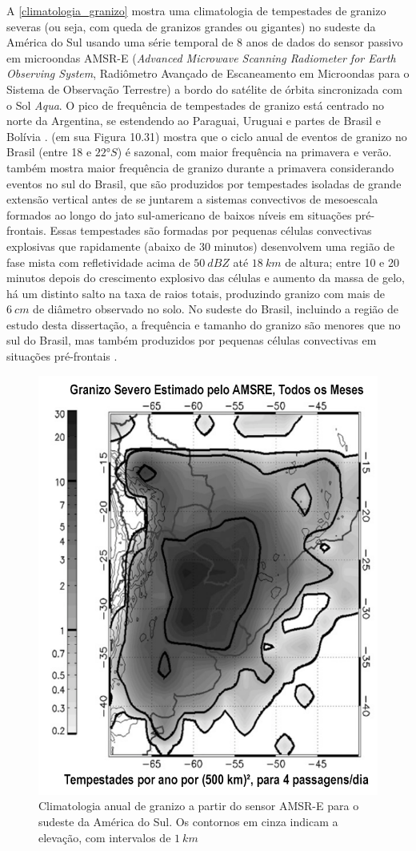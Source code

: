 A \autoref{climatologia_granizo} mostra uma climatologia de tempestades de granizo severas (ou seja, com queda de granizos grandes ou gigantes) no sudeste da América do Sul usando uma série temporal de 8 anos de dados do sensor passivo em microondas AMSR-E (\textit{Advanced Microwave Scanning Radiometer for Earth Observing System}, Radiômetro Avançado de Escaneamento em Microondas para o Sistema de Observação Terrestre) a bordo do satélite de órbita sincronizada com o Sol \textit{Aqua}. O pico de frequência de tempestades de granizo está centrado no norte da Argentina, se estendendo ao Paraguai, Uruguai e partes de Brasil e Bolívia \cite{Cecil2012a}.  (em sua Figura 10.31) mostra que o ciclo anual de eventos de granizo no Brasil (entre 18 e $\ang{22}S$) é sazonal, com maior frequência na primavera e verão.  também mostra maior frequência de granizo durante a primavera considerando eventos no sul do Brasil, que são produzidos por tempestades isoladas de grande extensão vertical antes de se juntarem a sistemas convectivos de mesoescala formados ao longo do jato sul-americano de baixos níveis em situações pré-frontais. Essas tempestades são formadas por pequenas células convectivas explosivas que rapidamente (abaixo de 30 minutos) desenvolvem uma região de fase mista com refletividade acima de $50\:dBZ$ até $18\:km$ de altura; entre 10 e 20 minutos depois do crescimento explosivo das células e aumento da massa de gelo, há um distinto salto na taxa de raios totais, produzindo granizo com mais de $6\:cm$ de diâmetro observado no solo. No sudeste do Brasil, incluindo a região de estudo desta dissertação, a frequência e tamanho do granizo são menores que no sul do Brasil, mas também produzidos por pequenas células convectivas em situações pré-frontais \cite{Puig2017}. 

\begin{figure}[htb]
	\begin{center}
		\caption{Climatologia anual de granizo a partir do sensor AMSR-E para o sudeste da América do Sul. Os contornos em cinza indicam a elevação, com intervalos de $1\:km$} 
		\label{climatologia_granizo}
		\includegraphics[width=0.5\columnwidth]{figs/cecil_severehail_ptbr.png}
	\end{center}
\end{figure}

